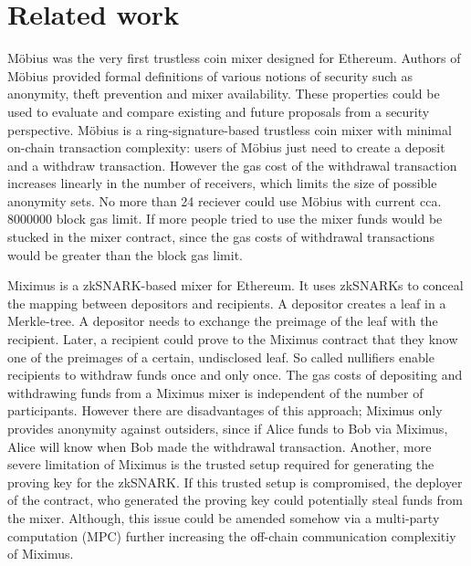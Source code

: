 \documentclass[a4paper,UKenglish,cleveref, autoref]{oasics-v2019}
\begin{document}
\section{Related work}
Möbius was the very first trustless coin mixer designed for Ethereum\cite{meiklejohn2018mobius}. Authors of Möbius provided formal definitions of various notions of security such as anonymity, theft prevention and mixer availability. These properties could be used to evaluate and compare existing and future proposals from a security perspective. Möbius is a ring-signature-based trustless coin mixer with minimal on-chain transaction complexity: users of Möbius just need to create a deposit and a withdraw transaction. However the gas cost of the withdrawal transaction increases linearly in the number of receivers, which limits the size of possible anonymity sets. No more than 24 reciever could use Möbius with current cca.$\num[group-separator={,}]{8000000}$  block gas limit. If more people tried to use the mixer funds would be stucked in the mixer contract, since the gas costs of withdrawal transactions would be greater than the block gas limit.

Miximus is a zkSNARK-based mixer for Ethereum\cite{miximus2018}. It uses zkSNARKs to conceal the mapping between depositors and recipients. A depositor creates a leaf in a Merkle-tree. A depositor needs to exchange the preimage of the leaf with the recipient. Later, a recipient could prove to the Miximus contract that they know one of the preimages of a certain, undisclosed leaf. So called nullifiers enable recipients to withdraw funds once and only once. The gas costs of depositing and withdrawing funds from a Miximus mixer is independent of the number of participants. However there are disadvantages of this approach; Miximus only provides anonymity against outsiders, since if Alice funds to Bob via Miximus, Alice will know when Bob made the withdrawal transaction. Another, more severe limitation of Miximus is the trusted setup required for generating the proving key for the zkSNARK. If this trusted setup is compromised, the deployer of the contract, who generated the proving key could potentially steal funds from the mixer. Although, this issue could be amended somehow via a multi-party computation (MPC) further increasing the off-chain communication complexitiy of Miximus.
\end{document}
